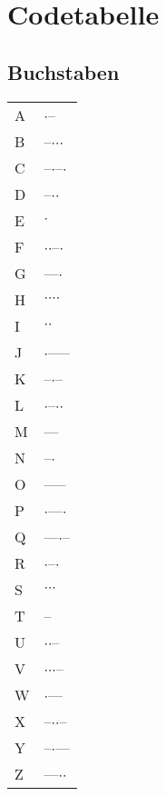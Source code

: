 \documentclass{scrartcl}
\newcommand{\dit}{{\LARGE\hskip1pt$\cdot$\hskip1pt}}
\newcommand{\dah}{{\LARGE\hskip1pt--\hskip1pt}}
\begin{document}
  \newpage
  
  \section{Codetabelle}
    \begin{minipage}[t]{.25\textwidth}
      \setlength{\parskip}{.5\baselineskip}
      \subsection{Buchstaben}
      
      \begin{tabular}{@{}ll}
        A & \dit \dah \\
        B & \dah \dit \dit \dit \\
        C &	\dah \dit \dah \dit \\
        D &	\dah \dit \dit \\
        E &	\dit \\
        F &	\dit \dit \dah \dit \\
        G &	\dah \dah \dit \\
        H &	\dit \dit \dit \dit \\
        I &	\dit \dit \\
        J &	\dit \dah \dah \dah \\
        K &	\dah \dit \dah \\
        L &	\dit \dah \dit \dit \\
        M &	\dah \dah \\
        N &	\dah \dit \\
        O &	\dah \dah \dah \\
        P &	\dit \dah \dah \dit \\
        Q &	\dah \dah \dit \dah \\
        R &	\dit \dah \dit \\
        S &	\dit \dit \dit \\
        T &	\dah \\
        U &	\dit \dit \dah \\
        V &	\dit \dit \dit \dah \\
        W &	\dit \dah \dah \\
        X &	\dah \dit \dit \dah \\
        Y	& \dah \dit \dah \dah \\
        Z &	\dah \dah \dit \dit
      \end{tabular}
    \end{minipage}
    \qquad
\end{document}
